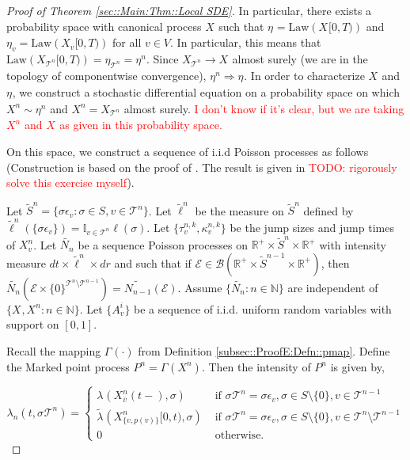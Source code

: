 \documentclass[12pt]{article}
\newcommand{\mb}{\mathbb}
\newcommand{\mc}{\mathcal}
\newcommand{\ms}{\mathscr}
\newcommand{\ra}{\rightarrow}
\newcommand{\ov}{\overline}
\newcommand{\te}{\text}
\newcommand{\ep}{\epsilon}
\newcommand{\tr}{\textcolor{red}}
\newcommand{\ind}{\hspace{24pt}}
\renewcommand{\v}{v}							%
\newcommand{\cl}{\ov}							%
\renewcommand{\S}{S}							%
\newcommand{\s}{\sigma}							%
\newcommand{\sv}[1]{\s^{#1}}					%
\newcommand{\ev}[1]{\ep_{#1}}					%
\newcommand{\T}{T}								%
\renewcommand{\t}{t}							%
\newcommand{\poiss}[1]{N_{#1}}						%
\newcommand{\law}{\te{Law}}							%
\newcommand{\pup}[1]{^{#1}}							%
\newcommand{\tree}{\mc{T}}							%
\newcommand{\V}{V}									%
\renewcommand{\r}{r}								%
\newcommand{\rt}[1]{\tau^{#1}}						%
\renewcommand{\it}{k}								%
\newcommand{\itt}{i}								%
\newcommand{\numb}{n}								%
\newcommand{\XState}[1]{\S^{#1}}				%
\newcommand{\rxvtn}[3]{X_{#1}^{#3}(#2)}				%
\newcommand{\rxvts}[2]{X_{#1}{#2}}					%
\newcommand{\rxvtsn}[3]{X_{#1}^{#3}{#2}}			%
\newcommand{\rp}[1]{P^{#1}}							%
\newcommand{\mmm}[3]{\eta_{#2#1}^{#3}}						%
\newcommand{\rate}[1]{\lambda_{#1}}					%
\newcommand{\crate}[2]{\alt{\lambda}_{#1}^{#2}}		%
\newcommand{\Sm}{\ell}								%
\newcommand{\alt}{\widetilde}						%
\newcommand{\rv}{A}								%
\newcommand{\evnt}{\mc{E}}						%
\renewcommand{\mark}[1]{\kappa^{#1}}				%
\newcommand{\p}[1]{p(#1)}						%
\newcommand{\pmap}[1]{\Gamma_{#1}}				%
\begin{document}
\begin{proof}[Proof of Theorem \ref{sec::Main:Thm::Local SDE}]
\ind In particular, there exists a probability space with canonical process \(\rxvts{}{}\) such that \(\mmm{}{}{} = \law(\rxvts{}{[0,\T)})\) and \(\mmm{\v}{}{} = \law(\rxvts{\v}{[0,\T)})\) for all \(\v \in \V\). In particular, this means that \(\law(\rxvts{\tree\pup{\numb}}{[0,\T)}) = \mmm{\tree\pup{\numb}}{}{} = \mmm{}{}{\numb}\). Since \(\rxvts{\tree\pup{\numb}}{} \ra \rxvts{}{}\) almost surely (we are in the topology of componentwise convergence), \(\mmm{}{}{\numb} \Rightarrow \mmm{}{}{}\). In order to characterize \(\rxvts{}{}\) and \(\mmm{}{}{}\), we construct a stochastic differential equation on a probability space on which \(\rxvtsn{}{}{\numb} \sim \mmm{}{}{\numb}\) and \(\rxvtsn{}{}{\numb} = \rxvts{\tree\pup{\numb}}{}\) almost surely. \tr{I don't know if it's clear, but we are taking \(\rxvtsn{}{}{\numb}\) and \(\rxvts{}{}\) as given in this probability space.}

\ind On this space, we construct a sequence of i.i.d Poisson processes as follows (Construction is based on the proof of \cite[Theorem 14.7.1(b)]{DalVer08}. The result is given in \cite[Exercise 14.7.1]{DalVer08} \tr{TODO: rigorously solve this exercise myself}).

\ind Let \(\alt{\S}^\numb = \{\s\ev{\v}: \s\in\S,\v \in \tree\pup{\numb}\}\). Let \(\alt{\Sm}\pup{\numb}\) be the measure on \(\alt{\S}^\numb\) defined by \(\alt{\Sm}\pup{\numb}(\{\s\ev{\v}\}) = \mb{I}_{\v \in \tree\pup{\numb}}\Sm(\s)\). Let \(\{\rt{\numb,\it}_\v,\mark{\numb,\it}_{\v}\}\) be the jump sizes and jump times of \(\rxvtsn{\v}{}{\numb}\). Let \(\alt{\poiss{\numb}}\) be a sequence Poisson processes on \(\mb{R}^+\times\alt{S}^\numb\times \mb{R}^+\) with intensity measure \(d\t\times\alt{\Sm}^\numb\times d\r\) and such that if \(\evnt \in \ms{B}(\mb{R}^+\times\alt{S}^{\numb-1}\times \mb{R}^+)\), then \(\alt{\poiss{\numb}}(\evnt\times \{0\}^{\tree\pup{\numb}\setminus\tree\pup{\numb-1}}) = \alt{\poiss{\numb-1}}(\evnt)\). Assume \(\{\alt{\poiss{\numb}}:\numb\in\mb{N}\}\) are independent of \(\{\rxvts{}{},\rxvtsn{}{}{\numb}:\numb\in\mb{N}\}\). Let \(\{\rv_{\v}^{\itt}\}\) be a sequence of i.i.d. uniform random variables with support on \([0,1]\).

\ind Recall the mapping \(\pmap{}(\cdot)\) from Definition \ref{subsec::ProofE:Defn::pmap}. Define the Marked point process \(\rp{\numb} = \pmap{}(\rxvtsn{}{}{\numb})\). Then the intensity of \(\rp{\numb}\) is given by,

\[\rate{\numb}(\t,\sv{}{\tree\pup{\numb}}) = \begin{cases}
\rate{}(\rxvtn{\cl{\v}}{\t-}{\numb},\s) &\te{ if } \sv{}{\tree\pup{\numb}} = \s\ev{\v},\s \in \S\setminus\{0\},\v\in\tree\pup{\numb-1}\\
\crate{}{}(\rxvtsn{\{\v,\p{\v}\}}{[0,\t)}{\numb},\s) &\te{ if } \sv{}{\tree\pup{\numb}} = \s\ev{\v},\s\in\S\setminus\{0\},\v\in\tree\pup{\numb}\setminus\tree\pup{\numb-1}\\
0 &\te{ otherwise.}
\end{cases}\]


\end{proof}
\end{document}
